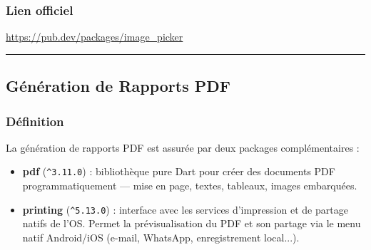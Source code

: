 \documentclass[12pt,a4paper]{report}
\begin{document}
\subsubsection*{Lien officiel}
\url{https://pub.dev/packages/image_picker}

\medskip\hrule\medskip

\subsection{Génération de Rapports PDF}

\noindent\begin{minipage}[t]{0.66\textwidth}
\subsubsection*{Définition}
La génération de rapports PDF est assurée par deux packages complémentaires :
\begin{itemize}
  \item \textbf{pdf} (\texttt{\^{}3.11.0}) : bibliothèque pure Dart pour créer des documents PDF programmatiquement — mise en page, textes, tableaux, images embarquées.
  \item \textbf{printing} (\texttt{\^{}5.13.0}) : interface avec les services d'impression et de partage natifs de l'OS. Permet la prévisualisation du PDF et son partage via le menu natif Android/iOS (e-mail, WhatsApp, enregistrement local...).
\end{itemize}
\end{minipage}\hfill
\begin{minipage}[t]{0.30\textwidth}
\vspace{0pt}
\begin{center}
\end{center}
\end{minipage}
\end{document}
